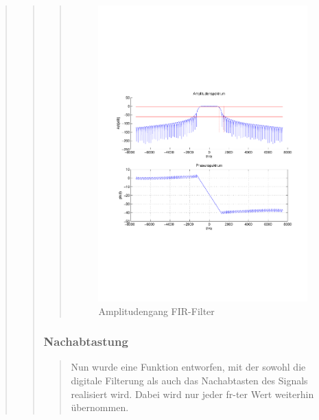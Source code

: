 \begin{quote}
\begin{quote}
\begin{quote}
		    \begin{figure}[H]
            \centering
                \includegraphics[scale=0.7, trim = 1cm 6cm 1cm 8cm, clip]{./Bilder/Amplitudengang_FIRFilter}
                    \caption{Amplitudengang FIR-Filter}
            \end{figure}
    
		    
		            
		            
		  \end{quote}          
		            
		  \subsubsection{Nachabtastung}
		  \begin{quote}
		            
		    Nun wurde eine Funktion entworfen, mit der sowohl die digitale Filterung als
		    auch das Nachabtasten des Signals realisiert wird. Dabei wird nur jeder
		    fr-ter Wert weiterhin übernommen.  
		 

\end{quote}
\end{quote}
\end{quote}

